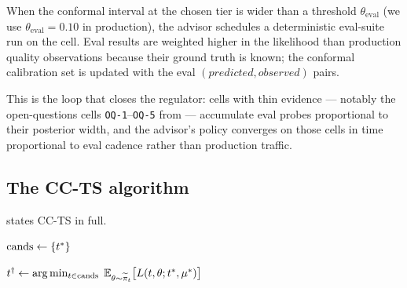When the conformal interval at the chosen tier is wider than a threshold
$\theta_{\mathrm{eval}}$ (we use $\theta_{\mathrm{eval}} = 0.10$ in
production), the advisor schedules a deterministic eval-suite run on the
cell. Eval results are weighted higher in the likelihood than production
quality observations because their ground truth is known; the conformal
calibration set is updated with the eval $(predicted, observed)$ pairs.

This is the loop that closes the regulator: cells with thin evidence ---
notably the open-questions cells \texttt{OQ-1}--\texttt{OQ-5} from
\cite{blackrim_moa1b} --- accumulate eval probes proportional to their
posterior width, and the advisor's policy converges on those cells in time
proportional to eval cadence rather than production traffic.

\subsection{The CC-TS algorithm}

 states CC-TS in full.

\begin{algorithm}[h]

\BlankLine
$\mathrm{cands} \leftarrow \{t^*\}$ 

$t^\dagger \leftarrow
  \arg\min_{t \in \mathrm{cands}} \;
    \mathbb{E}_{\theta \sim \widetilde{\pi}_{t}}
      \big[ L(t, \theta; t^*, \mu^*) \big]$


\;

\caption{CC-TS recommend.}
\label{alg:ccts}
\end{algorithm}

